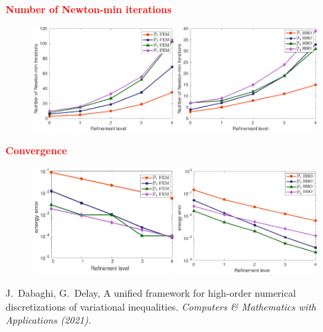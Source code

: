 \begin{frame}
  \textcolor{red}{\textbf{Number of Newton-min iterations}}
  \vspace*{0.3 cm}
  \begin{figure}
\centering
\includegraphics[width=0.48\textwidth]{number_newton_iter_FEM_2nd} \quad
\includegraphics[width=0.48\textwidth]{jump_nb_iter_Newton_HHO}
\end{figure}
  \end{frame}
\begin{frame}
  \textcolor{red}{\textbf{Convergence}}
  \vspace*{0.3 cm}
  \begin{figure}
\centering
\includegraphics[width=0.48\textwidth]{energy_error_2nd.pdf} \quad
\includegraphics[width=0.48\textwidth]{jump_energy_error_HHO}
  \end{figure}
  \begin{thebibliography}{10}
 \scriptsize{
 {\sc J.~Dabaghi, G.~Delay}, A unified framework for high-order numerical
discretizations of variational inequalities.
\em{Computers \& Mathematics with Applications} (2021).
}
 \end{thebibliography}
\end{frame}
